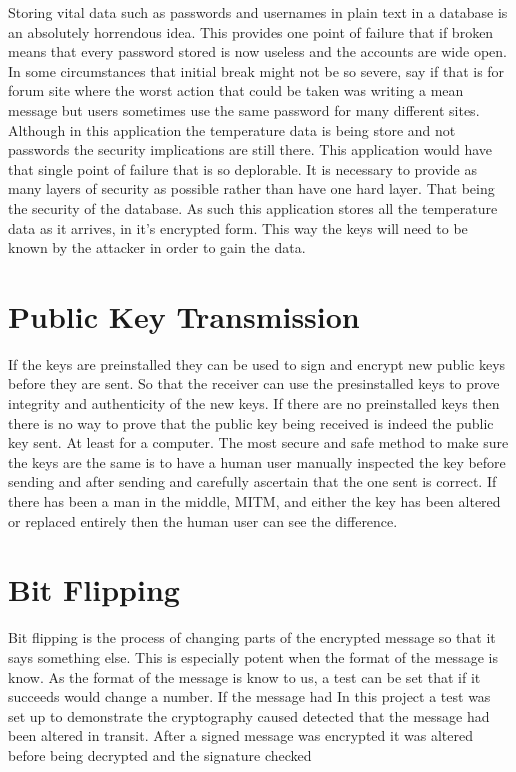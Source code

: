 Storing vital data such as passwords and usernames in plain text in a database is an absolutely horrendous idea. This provides one point of failure that if broken means that every password stored is now useless and the accounts are wide open. In some circumstances that initial break might not be so severe, say if that is for forum site where the worst action that could be taken was writing a mean message but users sometimes use the same password for many different sites. Although in this application the temperature data is being store and not passwords the security implications are still there. This application would have that single point of failure that is so deplorable. It is necessary to provide as many layers of security as possible rather than have one hard layer. That being the security of the database. As such this application stores all the temperature data as it arrives, in it's encrypted form. This way the keys will need to be known by the attacker in order to gain the data.

\section{Public Key Transmission}

If the keys are preinstalled they can be used to sign and encrypt new public keys before they are sent. So that the receiver can use the presinstalled keys to prove integrity and authenticity of the new keys. If there are no preinstalled keys then there is no way to prove that the public key being received is indeed the public key sent. At least for a computer. The most secure and safe method to make sure the keys are the same is to have a human user manually inspected the key before sending and after sending and carefully ascertain that the one sent is correct. If there has been a man in the middle, MITM, and either the key has been altered or replaced entirely then the human user can see the difference. 

\section{Bit Flipping}

Bit flipping is the process of changing parts of the encrypted message so that it says something else. This is especially potent when the format of the message is know. As the format of the message is know to us, a test can be set that if it succeeds would change a number. If the message had 
In this project a test was set up to demonstrate the cryptography caused detected that the message had been altered in transit.
After a signed message was encrypted it was altered before being decrypted and the signature checked

